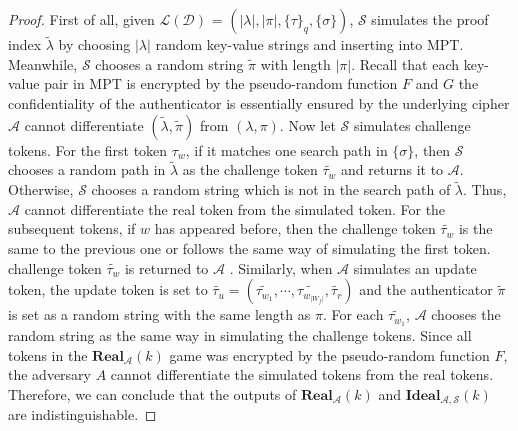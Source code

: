 \begin{proof}
  First of all, given $\mathcal{L}(\mathcal{D})$ = $(|\lambda|,|\pi|,\{\tau\}_q,\{\sigma\})$, $\mathcal{S}$ simulates the proof index $\tilde{\lambda}$ by choosing $|\lambda|$ random key-value strings and inserting into MPT. Meanwhile, $\mathcal{S}$ chooses a random  string $\tilde{\pi}$ with length $|\pi|$. Recall that each key-value pair in MPT is encrypted by the pseudo-random function $F$ and $G$ the confidentiality of the authenticator is essentially ensured by the underlying cipher $\mathcal{A}$ cannot differentiate $(\tilde{\lambda},\tilde{\pi})$ from $(\lambda,\pi)$.
  Now let $\mathcal{S}$ simulates challenge tokens. For the first token $\tau_w$, if it matches one search path in $\{\sigma\}$, then $\mathcal{S}$ chooses a random path in $\tilde{\lambda}$ as the challenge token $\tilde{\tau_w}$ and returns it to $\mathcal{A}$.  Otherwise, $\mathcal{S}$ chooses a random string which is not in the search path of $\tilde{\lambda}$. Thus, $\mathcal{A}$ cannot differentiate the real token from the simulated token. For the subsequent tokens, if $w$ has appeared before, then the challenge token $\tilde{\tau_w}$ is the same to the previous one or follows the same way of simulating the first token.  challenge token $\tilde{\tau_w}$ is returned to $\mathcal{A}$ .
  Similarly, when $\mathcal{A}$ simulates an update token, the update token is set to $\tilde{\tau_u} = (\tilde{\tau_{w_1}},\cdots,\tilde{\tau_{w_{|W_f|}}},\tilde{\tau_r})$ and the authenticator $\tilde{\pi}$ is set as a random string with the same length as $\pi$. For each $\tilde{\tau_{w_1}}$, $\mathcal{A}$ chooses the random string as the same way in simulating the challenge tokens.
  Since all tokens in the $\mathbf{Real}_\mathcal{A}(k)$ game was encrypted by the pseudo-random function $F$, the adversary $A$ cannot differentiate the simulated tokens from the real tokens. Therefore, we can conclude that the outputs of $\mathbf{Real}_\mathcal{A}(k)$ and $\mathbf{Ideal}_\mathcal{A,S}(k)$ are indistinguishable.
\end{proof}

